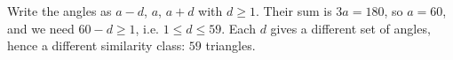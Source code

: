 Write the angles as $a-d$, $a$, $a+d$ with $d\ge1$. Their sum is $3a=180$, so $a=60$, and we need $60-d\ge1$, i.e. $1\le d\le59$. Each $d$ gives a different set of angles, hence a different similarity class: $\boxed{59}$ triangles.
